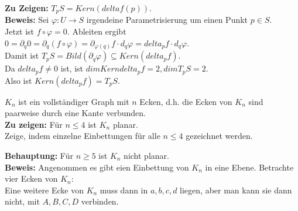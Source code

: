 \begin{problem*}[1b]
\textbf{Zu Zeigen:} $T_pS = Kern(delta f(p))$.\\
\textbf{Beweis:} Sei $ \varphi: U \to S $ irgendeine Parametrisierung um einen Punkt $ p \in S $.\\
Jetzt ist $f \circ \varphi = 0$. Ableiten ergibt\\
$ 0 = \partial_q 0 = \partial_q (f \circ \varphi) = \partial_{ \varphi(q) }f \cdot d_q \varphi = delta_p f \cdot d_q \varphi$.\\
Damit ist $T_pS = Bild(\partial_q \varphi) \subseteq Kern(delta_p f)$. \\
Da $delta_p f \neq 0$ ist, ist $dim Kern delta_p f = 2, dim T_pS = 2$. \\
Also ist $ Kern (delta_p f) = T_pS$.

\end{problem*}

\begin{problem*}[2a]
$K_n$ ist ein vollständiger Graph mit $ n $ Ecken, d.h. die Ecken von $ K_n $ sind paarweise durch eine Kante verbunden.\\
\textbf{Zu zeigen:} Für $n \leq 4$ ist $ K_n $ planar.\\
Zeige, indem einzelne Einbettungen für alle $ n \leq 4 $ gezeichnet werden.\\
\end{problem*}

\begin{problem*}[2b]
\textbf{Behauptung:} Für $n \geq 5$ ist $ K_n $ nicht planar.\\
\textbf{Beweis:} Angenommen es gibt eien Einbettung von $ K_n $ in eine Ebene. Betrachte vier Ecken von $ K_n $:\\
Eine weitere Ecke von $ K_n $ muss dann in $ a,b,c,d  $ liegen, aber man kann sie dann nicht, mit $ A, B, C, D $ verbinden.
\end{problem*}

